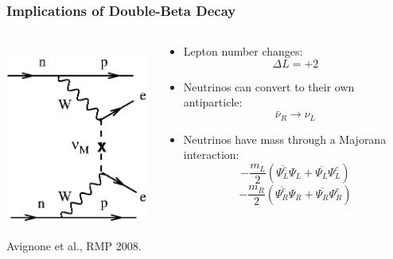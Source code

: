 \documentclass{beamer}
\begin{document}
\begin{frame}
\begin{center}
\frametitle{Implications of Double-Beta Decay}
\end{center}
\begin{columns}
\begin{column}{.5\textwidth}
\includegraphics[keepaspectratio=true,height=180pt]{Avignone_fig02b.eps}\\
\tiny Avignone et al., RMP 2008.
\end{column}
\begin{column}{.5\textwidth}
\begin{itemize}
\item Lepton number changes:\[\Delta L = +2\]
\item Neutrinos can convert to their own antiparticle:\[\bar{\nu}_R \rightarrow \nu_L\]
\item Neutrinos have mass through a Majorana interaction:
\[-\frac{m_L}{2}\left(\overline{\Psi^c_L} \Psi_L +  \overline{\Psi_L} \Psi^c_L\right)\]
\[-\frac{m_R}{2}\left(\overline{\Psi^c_R} \Psi_R +  \overline{\Psi_R} \Psi^c_R\right)\]
\end{itemize}
\end{column}
\end{columns}
\end{frame}
\end{document}
